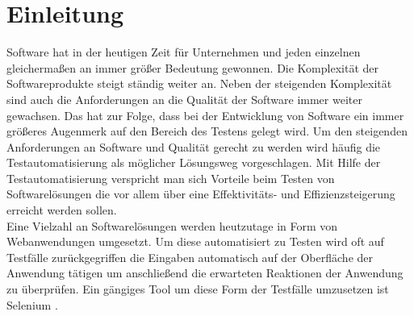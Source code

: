 \chapter{Einleitung}
\label{sec:einleitung}
Software hat in der heutigen Zeit für Unternehmen und jeden einzelnen gleichermaßen an immer größer Bedeutung gewonnen.
Die Komplexität der Softwareprodukte steigt ständig weiter an. Neben der steigenden Komplexität sind auch die Anforderungen an die Qualität der Software immer weiter gewachsen.
Das hat zur Folge, dass bei der Entwicklung von Software ein immer größeres Augenmerk auf den Bereich des Testens gelegt wird.
Um den steigenden Anforderungen an Software und Qualität gerecht zu werden wird häufig die Testautomatisierung als möglicher Lösungsweg vorgeschlagen.
Mit Hilfe der Testautomatisierung verspricht man sich Vorteile beim Testen von Softwarelösungen die vor allem über eine Effektivitäts- und Effizienzsteigerung erreicht werden sollen.\\
Eine Vielzahl an Softwarelösungen werden heutzutage in Form von Webanwendungen umgesetzt.
Um diese automatisiert zu Testen wird oft auf Testfälle zurückgegriffen die Eingaben automatisch auf der Oberfläche der Anwendung tätigen um anschließend die erwarteten Reaktionen der Anwendung zu überprüfen.
Ein gängiges Tool um diese Form der Testfälle umzusetzen ist Selenium \cite{selenium_selenium_2015}.
\\

